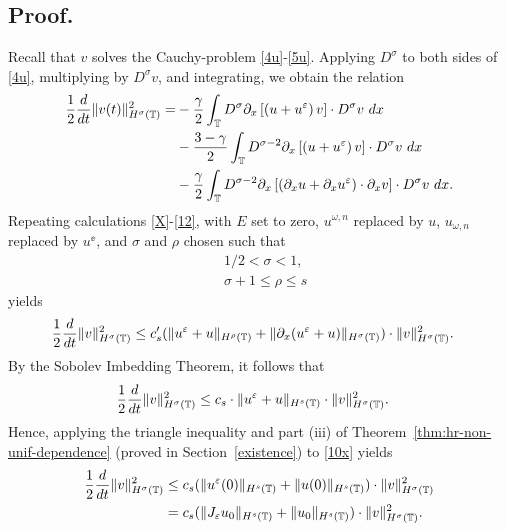 \subsection{Proof.}
Recall that $v$ solves the Cauchy-problem \eqref{4u}-\eqref{5u}.
Applying $D^\sigma$ to both sides of \eqref{4u}, multiplying by
$D^\sigma v$, and integrating, we obtain the
relation
\begin{equation*}
\begin{split}
\frac{1}{2}\frac{d}{dt}\|v(t)\|_{H^\sigma(\mathbb{T})}^2
= & - \frac{\gamma}{2}\int_{\mathbb{T}} D^\sigma
\partial_x \left[ \left( u + u^\varepsilon \right)v
\right]\cdot D^\sigma v \ dx
\\
& - \frac{3-\gamma}{2}\int_{\mathbb{T}} D^{\sigma
-2} \partial_x \left[ \left( u + u^\varepsilon
\right)v \right] \cdot D^\sigma v \ dx
\\
& - \frac{\gamma}{2}\int_{\mathbb{T}} D^{\sigma
-2}
\partial_x \left[ \left( \partial_x u + \partial_x u^\varepsilon
\right)\cdot \partial_x v \right] \cdot
D^\sigma v \ dx.
\end{split}
\end{equation*}
Repeating calculations \eqref{X}-\eqref{12}, with $E$ set to zero,
$u^{\omega,n}$ replaced by $u$, $u_{\omega,n}$ replaced by $u^\ee$, and
$\sigma$ and $\rho$ chosen such that
%
\begin{equation}
\label{size_of_sigma}
\begin{split}
& 1/2 < \sigma < 1,
\\
& \sigma + 1 \le \rho \le s 
\end{split}
\end{equation}
yields
\begin{equation*}
\begin{split}
\frac{1}{2}\frac{d}{dt} \|v\|_{H^\sigma(\mathbb{T})}^2
& \le
c_s' (\|u^{\varepsilon} + u\|_{H^{\rho}(\mathbb{T})} +
\|\partial_x(u^{\varepsilon} + u) \|_{H^\sigma(\mathbb{T})})
\cdot \|v\|_{H^\sigma(\mathbb{T})}^2.
\end{split}
\end{equation*}
\medskip
By the Sobolev Imbedding Theorem, it follows that 
\begin{equation}
\begin{split}
\frac{1}{2}\frac{d}{dt} \|v\|_{H^{\sigma}(\mathbb{T})}^2
& \le
c_s \cdot \|u^{\varepsilon}
+ u\|_{H^{s}(\mathbb{T})}\cdot \|v\|_{H^{\sigma}(\mathbb{T})}^2.
\label{10x}
\end{split}
\end{equation}
Hence, applying the triangle inequality and
part (iii) of Theorem~\ref{thm:hr-non-unif-dependence} (proved
in Section~\ref{existence}) to \eqref{10x} yields
%
\begin{equation}
\begin{split}
\label{11x}
\frac{1}{2}\frac{d}{dt} \|v\|_{H^{\sigma}(\mathbb{T})}^2
& \le
c_s (\|u^{\varepsilon}(0)\|_{H^{s}(\mathbb{T})}
+ \|u(0)\|_{H^{s}(\mathbb{T})})\cdot \|v\|_{H^{\sigma}(\mathbb{T})}^2
\\
& = c_s (\|J_\varepsilon u_0\|_{H^{s}(\mathbb{T})}
+ \|u_0\|_{H^{s}(\mathbb{T})})\cdot \|v\|_{H^{\sigma}(\mathbb{T})}^2.
\end{split}
\end{equation}
